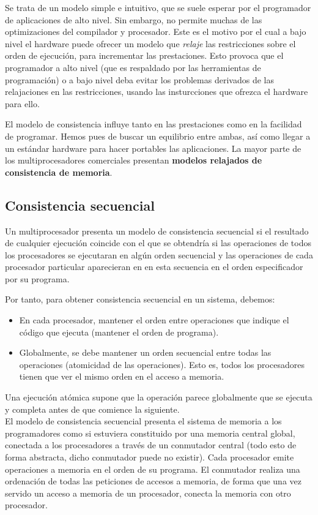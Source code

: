 Se trata de un modelo simple e intuitivo, que se suele esperar por el programador de aplicaciones de alto nivel. Sin embargo, no permite muchas de las optimizaciones del compilador y procesador. Este es el motivo por el cual a bajo nivel el hardware puede ofrecer un modelo que \emph{relaje} las restricciones sobre el orden de ejecución, para incrementar las prestaciones. Esto provoca que el programador a alto nivel (que es respaldado por las herramientas de programación) o a bajo nivel deba evitar los problemas derivados de las relajaciones en las restricciones, usando las insturcciones que ofrezca el hardware para ello.

El modelo de consistencia influye tanto en las prestaciones como en la facilidad de programar. Hemos pues de buscar un equilibrio entre ambas, así como llegar a un estándar hardware para hacer portables las aplicaciones. La mayor parte de los multiprocesadores comerciales presentan \textbf{modelos relajados de consistencia de memoria}. 

\subsection{Consistencia secuencial}
Un multiprocesador presenta un modelo de consistencia secuencial si el resultado de cualquier ejecución coincide con el que se obtendría si las operaciones de todos los procesadores se ejecutaran en algún orden secuencial y las operaciones de cada procesador particular aparecieran en en esta secuencia en el orden especificador por su programa.

Por tanto, para obtener consistencia secuencial en un sistema, debemos:
\begin{itemize}
    \item En cada procesador, mantener el orden entre operaciones que indique el código que ejecuta (mantener el orden de programa).
    \item Globalmente, se debe mantener un orden secuencial entre todas las operaciones (atomicidad de las operaciones). Esto es, todos los procesadores tienen que ver el mismo orden en el acceso a memoria.
\end{itemize}
Una ejecución atómica supone que la operación parece globalmente que se ejecuta y completa antes de que comience la siguiente.\\

El modelo de consistencia secuencial presenta el sistema de memoria a los programadores como si estuviera constituido por una memoria central global, conectada a los procesadores a través de un conmutador central (todo esto de forma abstracta, dicho conmutador puede no existir). Cada procesador emite operaciones a memoria en el orden de su programa. El conmutador realiza una ordenación de todas las peticiones de accesos a memoria, de forma que una vez servido un acceso a memoria de un procesador, conecta la memoria con otro procesador.

